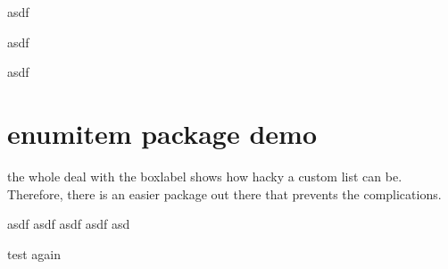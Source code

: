 \documentclass[12pt]{report}
\begin{document}
\begin{boxlabel}
\item asdf
\item asdf
\item asdf
\end{boxlabel}

\section{enumitem package demo}
the whole deal with the boxlabel shows how hacky a custom list can be. Therefore, there is an easier package out there that prevents the complications. 


\begin{myitems}
\item asdf asdf asdf asdf asd 
\item test again 
\end{myitems}
\end{document}
